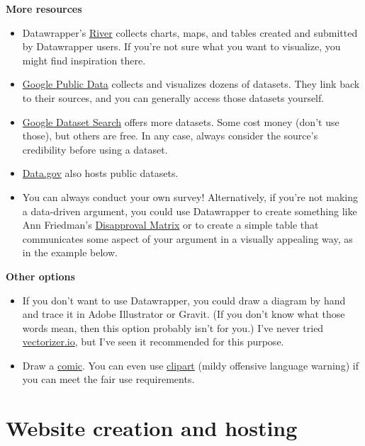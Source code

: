 \documentclass[]{book}
\providecommand{\tightlist}{%
  \setlength{\itemsep}{0pt}\setlength{\parskip}{0pt}}
\theoremstyle{definition}
\theoremstyle{definition}
\theoremstyle{definition}
\theoremstyle{remark}
\begin{document}
\textbf{More resources}

\begin{itemize}
\tightlist
\item
  Datawrapper's \href{https://river.datawrapper.de/}{River} collects
  charts, maps, and tables created and submitted by Datawrapper users.
  If you're not sure what you want to visualize, you might find
  inspiration there.
\item
  \href{https://www.google.com/publicdata/directory}{Google Public Data}
  collects and visualizes dozens of datasets. They link back to their
  sources, and you can generally access those datasets yourself.
\item
  \href{https://toolbox.google.com/datasetsearch}{Google Dataset Search}
  offers more datasets. Some cost money (don't use those), but others
  are free. In any case, always consider the source's credibility before
  using a dataset.
\item
  \href{https://www.data.gov/}{Data.gov} also hosts public datasets.
\item
  You can always conduct your own survey! Alternatively, if you're not
  making a data-driven argument, you could use Datawrapper to create
  something like Ann Friedman's
  \href{https://www.annfriedman.com/disapprovalmatrix/}{Disapproval
  Matrix} or to create a simple table that communicates some aspect of
  your argument in a visually appealing way, as in the example below.
\end{itemize}

\textbf{Other options}

\begin{itemize}
\tightlist
\item
  If you don't want to use Datawrapper, you could draw a diagram by hand
  and trace it in Adobe Illustrator or Gravit. (If you don't know what
  those words mean, then this option probably isn't for you.) I've never
  tried \href{https://vectorize.io}{vectorizer.io}, but I've seen it
  recommended for this purpose.
\item
  Draw a \href{https://xkcd.com}{comic}. You can even use
  \href{http://www.mnftiu.cc/category/fighting/}{clipart} (mildy
  offensive language warning) if you can meet the fair use requirements.
\end{itemize}

\hypertarget{websites}{%
\chapter{Website creation and hosting}\label{websites}}
\end{document}
